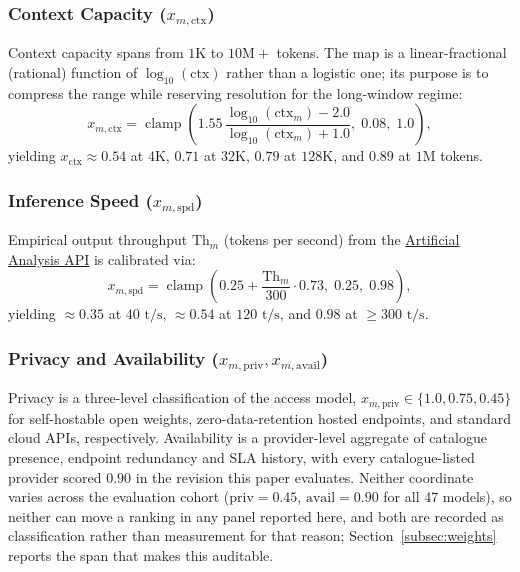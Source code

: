 \documentclass[pdflatex,sn-mathphys-num]{sn-jnl}
\theoremstyle{thmstyleone}
\theoremstyle{thmstylethree}
\begin{document}
\subsubsection{Context Capacity ($x_{m, \text{ctx}}$)}
Context capacity spans from $1\text{K}$ to $10\text{M}+$ tokens. The map is a linear-fractional (rational) function of $\log_{10}(\text{ctx})$ rather than a logistic one; its purpose is to compress the range while reserving resolution for the long-window regime:
\begin{equation}\label{eq:context_map}
x_{m, \text{ctx}} = \operatorname{clamp}\left( 1.55 \, \frac{\log_{10}(\text{ctx}_m) - 2.0}{\log_{10}(\text{ctx}_m) + 1.0}, \; 0.08, \; 1.0 \right),
\end{equation}
yielding $x_{\text{ctx}} \approx 0.54$ at $4\text{K}$, $0.71$ at $32\text{K}$, $0.79$ at $128\text{K}$, and $0.89$ at $1\text{M}$ tokens.

\subsubsection{Inference Speed ($x_{m, \text{spd}}$)}
Empirical output throughput $\text{Th}_m$ (tokens per second) from the \href{https://artificialanalysis.ai/api-reference}{Artificial Analysis API} is calibrated via:
\begin{equation}\label{eq:speed_map}
x_{m, \text{spd}} = \operatorname{clamp}\left( 0.25 + \frac{\text{Th}_m}{300} \cdot 0.73, \; 0.25, \; 0.98 \right),
\end{equation}
yielding $\approx 0.35$ at $40\text{ t/s}$, $\approx 0.54$ at $120\text{ t/s}$, and $0.98$ at $\ge 300\text{ t/s}$.

\subsubsection{Privacy and Availability ($x_{m, \text{priv}}, x_{m, \text{avail}}$)}
Privacy is a three-level classification of the access model, $x_{m,\text{priv}} \in \{1.0,0.75,0.45\}$ for self-hostable open weights, zero-data-retention hosted endpoints, and standard cloud APIs, respectively. Availability is a provider-level aggregate of catalogue presence, endpoint redundancy and SLA history, with every catalogue-listed provider scored $0.90$ in the revision this paper evaluates. Neither coordinate varies across the evaluation cohort ($\text{priv} = 0.45$, $\text{avail} = 0.90$ for all 47 models), so neither can move a ranking in any panel reported here, and both are recorded as classification rather than measurement for that reason; Section~\ref{subsec:weights} reports the span that makes this auditable.
\end{document}
